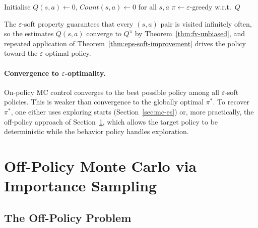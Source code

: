 \begin{algorithm}[ht]
\caption{On-Policy First-Visit MC Control ($\varepsilon$-greedy)}
\label{alg:on-policy-mc}
Initialise $Q(s,a) \leftarrow 0$, $\mathit{Count}(s,a) \leftarrow 0$ for all $s, a$\;
$\pi \leftarrow \varepsilon$-greedy w.r.t.\ $Q$\;
\end{algorithm}

The $\varepsilon$-soft property guarantees that every $(s, a)$ pair is visited infinitely often, so the estimates $Q(s, a)$ converge to $Q^\pi$ by Theorem~\ref{thm:fv-unbiased}, and repeated application of Theorem~\ref{thm:eps-soft-improvement} drives the policy toward the $\varepsilon$-optimal policy.

\paragraph{Convergence to $\varepsilon$-optimality.}  On-policy MC control converges to the best possible policy among all $\varepsilon$-soft policies.  This is weaker than convergence to the globally optimal $\pi^*$.  To recover $\pi^*$, one either uses exploring starts (Section~\ref{sec:mc-es}) or, more practically, the off-policy approach of Section~\ref{sec:mc-importance-sampling}, which allows the target policy to be deterministic while the behavior policy handles exploration.


\section{Off-Policy Monte Carlo via Importance Sampling}
\label{sec:mc-importance-sampling}

\subsection*{The Off-Policy Problem}

